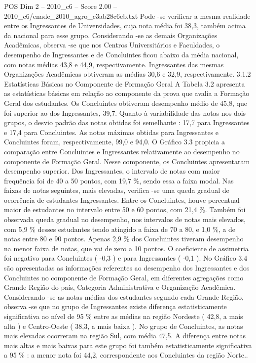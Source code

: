 \begin{textsample}{POS Dim 2 – 2010\_c6 – Score 2.00 – 2010\_c6/enade\_2010\_agro\_c3ab28c6eb.txt}
Pode -se verificar a mesma realidade entre os Ingressantes de Universidades, cuja nota média foi 38,3, também acima da nacional para esse grupo.
Considerando -se as demais Organizações Acadêmicas, observa -se que nos Centros Universitários e Faculdades, o desempenho de Ingressantes e de Concluintes ficou abaixo da média nacional, com notas médias 43,8 e 44,9, respectivamente.
Ingressantes das mesmas Organizações Acadêmicas obtiveram as médias 30,6 e 32,9, respectivamente. 3.1.2 Estatísticas Básicas no Componente de Formação Geral A Tabela 3.2 apresenta as estatísticas básicas em relação ao componente da prova que avalia a Formação Geral dos estudantes.
Os Concluintes obtiveram desempenho médio de 45,8, que foi superior ao dos Ingressantes, 39,7.
Quanto à variabilidade das notas nos dois grupos, o desvio padrão das notas obtidas foi semelhante : 17,7 para Ingressantes e 17,4 para Concluintes.
As notas máximas obtidas para Ingressantes e Concluintes foram, respectivamente, 99,0 e 94,0.
O Gráfico 3.3 propicia a comparação entre Concluintes e Ingressantes relativamente ao desempenho no componente de Formação Geral.
Nesse componente, os Concluintes apresentaram desempenho superior.
Dos Ingressantes, o intervalo de notas com maior frequência foi de 40 a 50 pontos, com 19,7 \%, sendo essa a faixa modal.
Nas faixas de notas seguintes, mais elevadas, verifica -se uma queda gradual de ocorrência de estudantes Ingressantes.
Entre os Concluintes, houve percentual maior de estudantes no intervalo entre 50 e 60 pontos, com 21,4 \%.
Também foi observada queda gradual no desempenho, nos intervalos de notas mais elevados, com 5,9 \% desses estudantes tendo atingido a faixa de 70 a 80, e 1,0 \%, a de notas entre 80 e 90 pontos.
Apenas 2,9 \% dos Concluintes tiveram desempenho na menor faixa de notas, que vai de zero a 10 pontos.
O coeficiente de assimetria foi negativo para Concluintes ( -0,3 ) e para Ingressantes ( -0,1 ).
No Gráfico 3.4 são apresentadas as informações referentes ao desempenho dos Ingressantes e dos Concluintes no componente de Formação Geral, em diferentes agregações como Grande Região do país, Categoria Administrativa e Organização Acadêmica.
Considerando -se as notas médias dos estudantes segundo cada Grande Região, observa -se que no grupo de Ingressantes existe diferença estatisticamente significativa ao nível de 95 \% entre as médias na região Nordeste ( 42,8, a mais alta ) e Centro-Oeste ( 38,3, a mais baixa ).
No grupo de Concluintes, as notas mais elevadas ocorreram na região Sul, com média 47,5.
A diferença entre notas mais altas e mais baixas para este grupo foi também estatisticamente significativa a 95 \% : a menor nota foi 44,2, correspondente aos Concluintes da região Norte..

\end{textsample}
